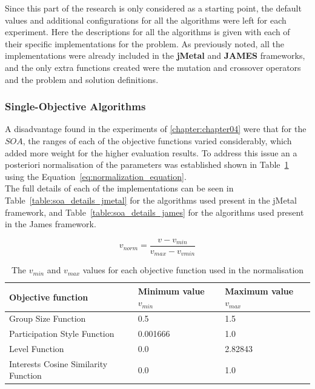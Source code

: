 Since this part of the research is only considered as a starting point, the default values and additional configurations for all the algorithms were left for each experiment. Here the descriptions for all the algorithms is given with each of their specific implementations for the problem. As previously noted, all the implementations were already included in the \textbf{jMetal} and \textbf{JAMES} frameworks, and the only extra functions created were the mutation and crossover operators and the problem and solution definitions.

\subsubsection{Single-Objective Algorithms}

A disadvantage found in the experiments of \ref{chapter:chapter04} were that for the $SOA$, the ranges of each of the objective functions varied considerably, which added more weight for the higher evaluation results. To address this issue an a posteriori normalisation of the parameters was established shown in Table~\ref{table:normalization_parameters} using the Equation~\ref{eq:normalization_equation}. \\

The full details of each of the implementations can be seen in Table~\ref{table:soa_details_jmetal} for the algorithms used present in the jMetal framework, and Table~\ref{table:soa_details_james} for the algorithms used present in the James framework.

\begin{equation}
    v_{norm} = \frac{v- v_{min}}{v_{max} - v_{vmin}} 
    \label{eq:normalization_equation}
\end{equation}

\begin{table}[]
    \begin{tabular}{lll}
    \hline
    Objective function & Minimum value $v_{min}$ & Maximum value $v_{max}$ \\
    \hline
    Group Size Function                  & 0.5                     & 1.5                     \\
    Participation Style Function         & 0.001666                & 1.0                     \\
    Level Function                       & 0.0                     & 2.82843                 \\
    Interests Cosine Similarity Function & 0.0                     & 1.0                     \\
    \hline
    \end{tabular}
    \caption{The $v_{min}$ and $v_{max}$ values for each objective function used in the normalisation}
    \label{table:normalization_parameters}
\end{table}

